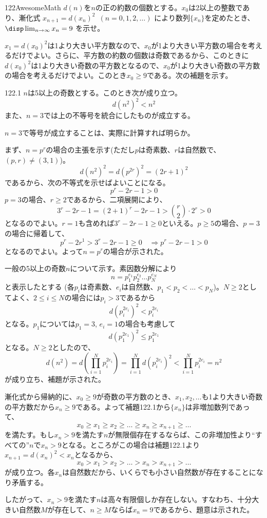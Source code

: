 \begin{thm}{122}{}{AwesomeMath}
 $d(n)$を$n$の正の約数の個数とする。$x_0$は2以上の整数であり、漸化式 $x_{n+1}=d(x_n)^2$~$(n=0, 1, 2, \ldots)$ により数列$\{x_n\}$を定めたとき、$\disp \lim_{n\to\infty} x_n = 9$ を示せ。
\end{thm}

$x_1=d(x_0)^2$は1より大きい平方数なので、$x_0$が1より大きい平方数の場合を考えるだけでよい。さらに、平方数の約数の個数は奇数であるから、このときに$d(x_0)^2$は1より大きい奇数の平方数となるので、$x_0$が1より大きい奇数の平方数の場合を考えるだけでよい。このとき$x_0\ge 9$である。次の補題を示す。

\begin{subthm}{122.1}
 $n$は5以上の奇数とする。このとき次が成り立つ。
 \[ d(n^2)^2<n^2 \]
 また、$n=3$では上の不等号を統合にしたものが成立する。
\end{subthm}

$n=3$で等号が成立することは、実際に計算すれば明らか。

まず、$n=p^r$の場合の主張を示す(ただし$p$は奇素数、$r$は自然数で、$(p,r)\neq (3, 1)$)。
\[ d(n^2)^2=d(p^{2r})^2=(2r+1)^2 \]
であるから、次の不等式を示せばよいことになる。
\[ p^r-2r-1>0 \]
$p=3$の場合、$r\ge 2$であるから、二項展開により、
\[ 3^r-2r-1=(2+1)^r-2r-1>\binom{r}{2}\cdot 2^r > 0 \]
となるのでよい。$r=1$も含めれば$3^r-2r-1\ge 0$といえる。$p\ge 5$の場合、$p=3$の場合に帰着して、
\[ p^r-2r^1>3^r-2r-1\ge 0 \quad\Rightarrow p^r-2r-1>0 \]
となるのでよい。よって$n=p^r$の場合が示された。

一般の5以上の奇数$n$について示す。素因数分解により
\[ n=p_1^{e_1}p_2^{e_2}\dots p_N^{e_N} \]
と表示したとする (各$p_i$は奇素数、$e_i$は自然数、$p_1<p_2<\dots <p_N$)。$N\ge 2$としてよく、$2\le i\le N$の場合には$p_i>3$であるから
\[ d(p_i^{2e_i})^2<p_i^{2e_i} \]
となる。$p_1$については$p_1=3$, $e_i=1$の場合も考慮して
\[ d(p_1^{2e_1})^2\le p_1^{2e_1} \]
となる。$N\ge 2$としたので、
\[ d(n^2)=d\left(\prod_{i=1}^N p_i^{2e_i}\right) = \prod_{i=1}^N d(p_i^{2e_i})^2<\prod_{i=1}^Np_i^{2e_i}=n^2 \]
が成り立ち、補題が示された。

漸化式から帰納的に、$x_0\ge 9$が奇数の平方数のとき、$x_1, x_2, \dots$も1より大きい奇数の平方数だから$x_n\ge 9$である。よって補題122.1から$\{x_n\}$は非増加数列であって、
\[ x_0\ge x_1\ge x_2\ge \dots \ge x_n \ge x_{n+1}\ge \dots \]
を満たす。もし$x_n>9$を満たす$n$が無限個存在するならば、この非増加性より``すべての''$n$で$x_n>9$となる。ところがこの場合は補題122.1より$x_{n+1}=d(x_n)^2<x_n$となるから、
\[ x_0>x_1>x_2>\dots > x_n>x_{n+1}>\dots \]
が成り立つ。各$x_n$は自然数だから、いくらでも小さい自然数が存在することになり矛盾する。

したがって、$x_n>9$を満たす$n$は高々有限個しか存在しない。すなわち、十分大きい自然数$M$が存在して、$n\ge M$ならば$x_n=9$であるから、題意は示された。